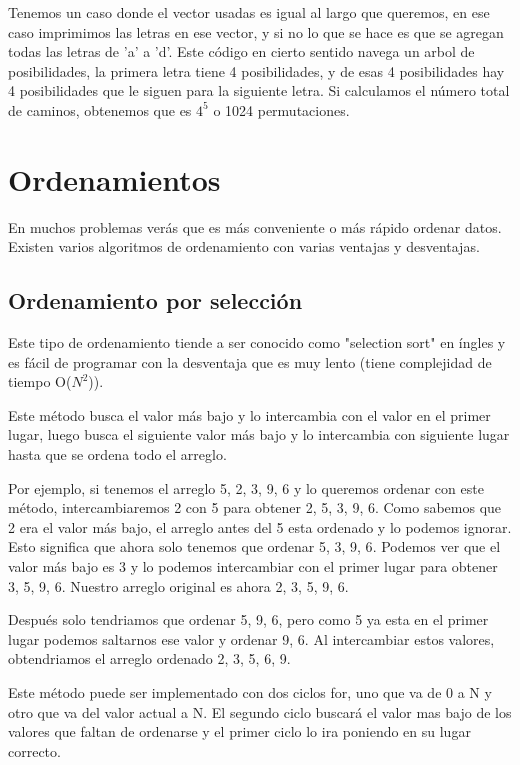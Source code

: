 \documentclass{article}
\begin{document}
Tenemos un caso donde el vector usadas es igual al largo que queremos, en ese caso imprimimos las letras en ese vector, y si no lo que se hace es que se agregan todas las letras de 'a' a 'd'. Este código en cierto sentido navega un arbol de posibilidades, la primera letra tiene 4 posibilidades, y de esas 4 posibilidades hay 4 posibilidades que le siguen para la siguiente letra. Si calculamos el número total de caminos, obtenemos que es $4^5$ o 1024 permutaciones.

\section{Ordenamientos}

En muchos problemas verás que es más conveniente o más rápido ordenar datos. Existen varios algoritmos de ordenamiento con varias ventajas y desventajas.

\subsection{Ordenamiento por selección}

Este tipo de ordenamiento tiende a ser conocido como "selection sort" en íngles y es fácil de programar con la desventaja que es muy lento (tiene complejidad de tiempo O($N^2$)).

Este método busca el valor más bajo y lo intercambia con el valor en el primer lugar, luego busca el siguiente valor más bajo y lo intercambia con siguiente lugar hasta que se ordena todo el arreglo.

Por ejemplo, si tenemos el arreglo {5, 2, 3, 9, 6} y lo queremos ordenar con este método, intercambiaremos 2 con 5 para obtener {2, 5, 3, 9, 6}. Como sabemos que 2 era el valor más bajo, el arreglo antes del 5 esta ordenado y lo podemos ignorar. Esto significa que ahora solo tenemos que ordenar {5, 3, 9, 6}. Podemos ver que el valor más bajo es 3 y lo podemos intercambiar con el primer lugar para obtener {3, 5, 9, 6}. Nuestro arreglo original es ahora {2, 3, 5, 9, 6}.

Después solo tendriamos que ordenar {5, 9, 6}, pero como 5 ya esta en el primer lugar podemos saltarnos ese valor y ordenar {9, 6}. Al intercambiar estos valores, obtendriamos el arreglo ordenado {2, 3, 5, 6, 9}.

Este método puede ser implementado con dos ciclos for, uno que va de 0 a N y otro que va del valor actual a N. El segundo ciclo buscará el valor mas bajo de los valores que faltan de ordenarse y el primer ciclo lo ira poniendo en su lugar correcto.
\end{document}
